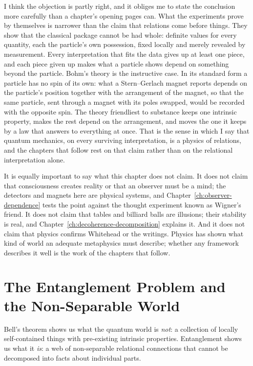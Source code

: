 I think the objection is partly right, and it obliges me to state the conclusion more carefully than a chapter's opening pages can. What the experiments prove by themselves is narrower than the claim that relations come before things. They show that the classical package cannot be had whole: definite values for every quantity, each the particle's own possession, fixed locally and merely revealed by measurement. Every interpretation that fits the data gives up at least one piece, and each piece given up makes what a particle shows depend on something beyond the particle. Bohm's theory is the instructive case. In its standard form a particle has no spin of its own: what a Stern--Gerlach magnet reports depends on the particle's position together with the arrangement of the magnet, so that the same particle, sent through a magnet with its poles swapped, would be recorded with the opposite spin. The theory friendliest to substance keeps one intrinsic property, makes the rest depend on the arrangement, and moves the one it keeps by a law that answers to everything at once. That is the sense in which I say that quantum mechanics, on every surviving interpretation, is a physics of relations, and the chapters that follow rest on that claim rather than on the relational interpretation alone.

It is equally important to say what this chapter does not claim. It does not claim that consciousness creates reality or that an observer must be a mind; the detectors and magnets here are physical systems, and Chapter~\ref{ch:observer-dependence} tests the point against the thought experiment known as Wigner's friend. It does not claim that tables and billiard balls are illusions; their stability is real, and Chapter~\ref{ch:decoherence-decomposition} explains it. And it does not claim that physics confirms Whitehead or the \bahai writings. Physics has shown what kind of world an adequate metaphysics must describe; whether any framework describes it well is the work of the chapters that follow.

\section{The Entanglement Problem and the Non-Separable World}
\label{sec:ch1-entanglement}

Bell's theorem shows us what the quantum world is \emph{not}: a collection of locally self-contained things with pre-existing intrinsic properties. Entanglement shows us what it \emph{is}: a web of non-separable relational connections that cannot be decomposed into facts about individual parts.

